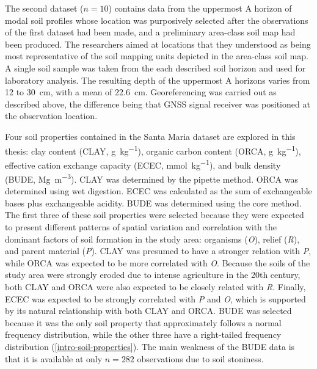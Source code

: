 The second dataset ($n = 10$) contains data from the uppermost A horizon of modal soil profiles 
whose location was purposively selected after the observations of the first dataset had been made, 
and a preliminary area-class soil map had been produced. The researchers aimed at locations that 
they understood as being most representative of the soil mapping units depicted in the area-class 
soil map. A single soil sample was taken from the each described soil horizon and used for 
laboratory analysis. The resulting depth of the uppermost A horizons varies from \num{12} to 
\SI{30}{\centi\metre}, with a mean of \SI{22.6}{\centi\metre}. Georeferencing was carried out as 
described above, the difference being that GNSS signal receiver was positioned at the observation 
location.

Four soil properties contained in the Santa Maria dataset are explored in this thesis: clay content
(CLAY, \si{\gram\per\kilo\gram}), organic carbon content (ORCA, \si{\gram\per\kilo\gram}), 
effective cation exchange capacity (ECEC, \si{\milli\mole\per\kilo\gram}), and bulk density 
(BUDE, \si{\mega\gram\per\cubic\metre}). CLAY was 
determined by the pipette method. ORCA was determined using wet digestion. ECEC was calculated as 
the sum of exchangeable bases plus exchangeable acidity. BUDE was determined using the core method. 
The first three of these soil properties were selected because they were expected to present 
different patterns of spatial variation and correlation with the dominant factors of soil formation 
in the study area: organisms (\textit{O}), relief (\textit{R}), and parent material (\textit{P}). 
CLAY was presumed to have a stronger relation with \textit{P}, while ORCA was expected to be more 
correlated with \textit{O}. Because the soils of the study area were strongly eroded due to intense 
agriculture in the 20th century, both CLAY and ORCA were also expected to be closely related with 
\textit{R}. Finally, ECEC was expected to be strongly correlated with \textit{P} and \textit{O}, 
which is supported by its natural relationship with both CLAY and ORCA. BUDE was selected because it
was the only soil property that approximately follows a normal frequency distribution, while the 
other three have a right-tailed frequency distribution (\autoref{intro-soil-properties}). The main 
weakness of the BUDE data is that it is available at only $n = 282$ observations due to soil stoniness.

